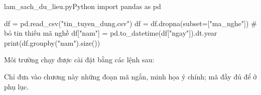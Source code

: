 \begin{khungma}{lam_sach_du_lieu.py}{Python}
import pandas as pd

df = pd.read_csv("tin_tuyen_dung.csv")
df = df.dropna(subset=["ma_nghe"])       # bỏ tin thiếu mã nghề
df["nam"] = pd.to_datetime(df["ngay"]).dt.year
print(df.groupby("nam").size())
\end{khungma}

Môi trường chạy được cài đặt bằng các lệnh sau:


\begin{goiy}
  Chỉ đưa vào chương này những đoạn mã ngắn, minh họa ý chính; mã đầy đủ để ở phụ lục.
\end{goiy}
